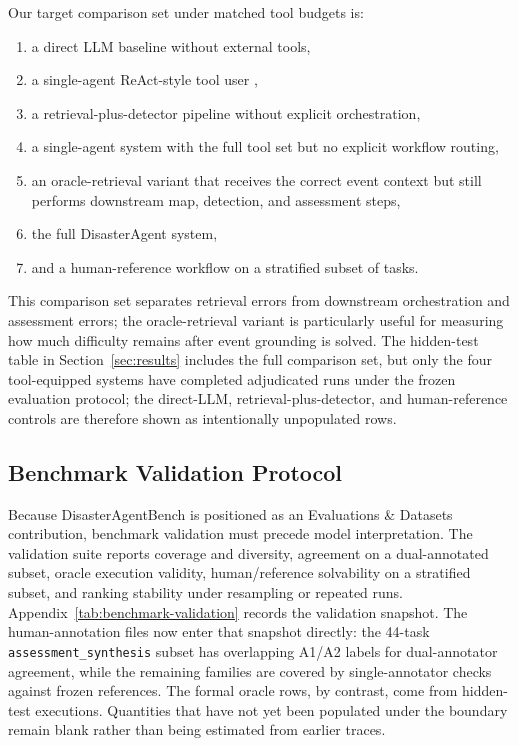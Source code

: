 \documentclass{article}
\begin{document}
Our target comparison set under matched tool budgets is:
\begin{enumerate}[leftmargin=1.2em]
    \item a direct LLM baseline without external tools,
    \item a single-agent ReAct-style tool user \citep{yao2023react},
    \item a retrieval-plus-detector pipeline without explicit orchestration,
    \item a single-agent system with the full tool set but no explicit workflow routing,
    \item an oracle-retrieval variant that receives the correct event context but still performs downstream map, detection, and assessment steps,
    \item the full DisasterAgent system,
    \item and a human-reference workflow on a stratified subset of tasks.
\end{enumerate}

This comparison set separates retrieval errors from downstream orchestration and assessment errors; the oracle-retrieval variant is particularly useful for measuring how much difficulty remains after event grounding is solved.
The hidden-test table in Section~\ref{sec:results} includes the full comparison set, but only the four tool-equipped systems have completed adjudicated runs under the frozen evaluation protocol; the direct-LLM, retrieval-plus-detector, and human-reference controls are therefore shown as intentionally unpopulated rows.

\subsection{Benchmark Validation Protocol}

Because DisasterAgentBench is positioned as an Evaluations \& Datasets contribution, benchmark validation must precede model interpretation. The validation suite reports coverage and diversity, agreement on a dual-annotated subset, oracle execution validity, human/reference solvability on a stratified subset, and ranking stability under resampling or repeated runs. Appendix~\ref{tab:benchmark-validation} records the validation snapshot. The human-annotation files now enter that snapshot directly: the 44-task \texttt{assessment\_synthesis} subset has overlapping A1/A2 labels for dual-annotator agreement, while the remaining families are covered by single-annotator checks against frozen references. The formal oracle rows, by contrast, come from hidden-test executions. Quantities that have not yet been populated under the boundary remain blank rather than being estimated from earlier traces.
\end{document}
